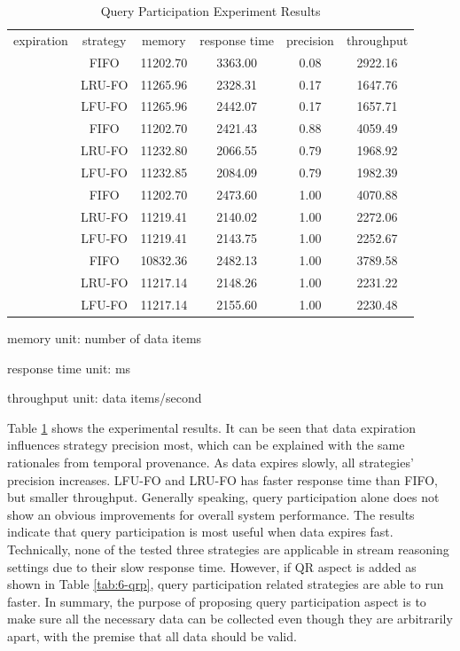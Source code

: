 \begin{table}[!htbp]
	\centering
    \caption{Query Participation Experiment Results}
    \label{tab:6-qpp}
    \begin{tabular}{|c||c||c|c|c|c|} \hline
    expiration & strategy & memory & response time & precision & throughput \\ \hhline{|=#=#=|=|=|=|}
    \multirow{3}{*}{quick} & FIFO   & 11202.70 & 3363.00 & 0.08 & 2922.16 \\ \cline{2-6} 
 					      & LRU-FO & 11265.96 & 2328.31 & 0.17 & 1647.76 \\ \cline{2-6} 
 					      & LFU-FO & 11265.96 & 2442.07 & 0.17 & 1657.71 \\ \hhline{|=#=#=|=|=|=|}
	\multirow{3}{*}{normal} & FIFO   & 11202.70 & 2421.43 & 0.88 & 4059.49 \\ \cline{2-6} 
 						    & LRU-FO & 11232.80 & 2066.55 & 0.79 & 1968.92 \\ \cline{2-6} 
 						    & LFU-FO & 11232.85 & 2084.09 & 0.79 & 1982.39 \\ \hhline{|=#=#=|=|=|=|}
	\multirow{3}{*}{slow} & FIFO & 11202.70   & 2473.60 & 1.00 & 4070.88 \\ \cline{2-6} 
					      & LRU-FO & 11219.41 & 2140.02 & 1.00 & 2272.06 \\ \cline{2-6} 
 					      & LFU-FO & 11219.41 & 2143.75 & 1.00 & 2252.67 \\ \hhline{|=#=#=|=|=|=|}
    \multirow{3}{*}{none} & FIFO & 10832.36 & 2482.13 & 1.00 & 3789.58 \\ \cline{2-6}
    					  & LRU-FO & 11217.14 & 2148.26 & 1.00 & 2231.22 \\ \cline{2-6}
                          & LFU-FO & 11217.14 & 2155.60 & 1.00 & 2230.48 \\ \hline
	\end{tabular}
    \begin{tablenotes}
 		\item memory unit: number of data items
 		\item response time unit: ms
 		\item throughput unit: data items/second
    \end{tablenotes}
\end{table}

Table \ref{tab:6-qpp} shows the experimental results. 
It can be seen that data expiration influences strategy precision most, which can be explained with the same rationales from temporal provenance. 
As data expires slowly, all strategies' precision increases. 
LFU-FO and LRU-FO has faster response time than FIFO, but smaller throughput. 
Generally speaking, query participation alone does not show an obvious improvements for overall system performance.
The results indicate that query participation is most useful when data expires fast.
Technically, none of the tested three strategies are applicable in stream reasoning settings due to their slow response time. 
However, if QR aspect is added as shown in Table \ref{tab:6-qrp}, query participation related strategies are able to run faster. 
In summary, the purpose of proposing query participation aspect is to make sure all the necessary data can be collected even though they are arbitrarily apart, with the premise that all data should be valid.
%
